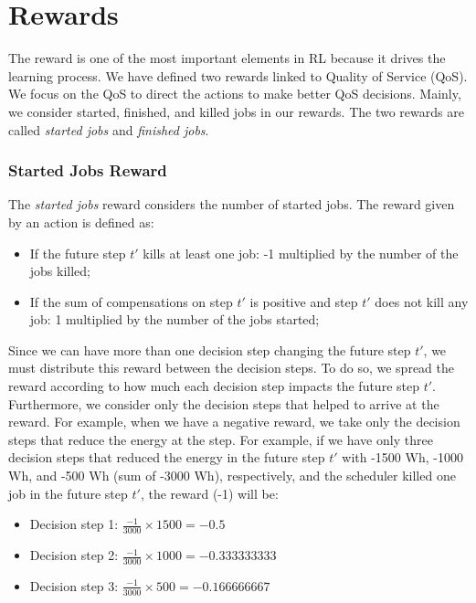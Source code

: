 \section{Rewards}

The reward is one of the most important elements in RL because it drives the learning process. We have defined two rewards linked to Quality of Service (QoS). We focus on the QoS to direct the actions to make better QoS decisions. Mainly, we consider started, finished, and killed jobs in our rewards. The two rewards are called \emph{started jobs} and \emph{finished jobs}. 

\subsubsection{Started Jobs Reward}

The \emph{started jobs} reward considers the number of started jobs. The reward given by an action is defined as:
\begin{itemize}
    \item If the future step $t'$ kills at least one job: -1 multiplied by the number of the jobs killed;
    \item If the sum of compensations on step $t'$ is positive and step $t'$ does not kill any job: 1 multiplied by the number of the jobs started;
\end{itemize}

Since we can have more than one decision step changing the future step $t'$, we must distribute this reward between the decision steps. To do so, we spread the reward according to how much each decision step impacts the future step $t'$. Furthermore, we consider only the decision steps that helped to arrive at the reward. For example, when we have a negative reward, we take only the decision steps that reduce the energy at the step. For example, if we have only three decision steps that reduced the energy in the future step $t'$ with -1500 Wh, -1000 Wh, and -500 Wh (sum of -3000 Wh), respectively, and the scheduler killed one job in the future step $t'$, the reward (-1) will be:
\begin{itemize}
    \item Decision step 1: \(\frac{-1}{3000} \times 1500 = -0.5\)
    \item Decision step 2: \(\frac{-1}{3000} \times 1000 = -0.333333333\)
    \item Decision step 3: \(\frac{-1}{3000} \times 500 = -0.166666667\)
\end{itemize}

